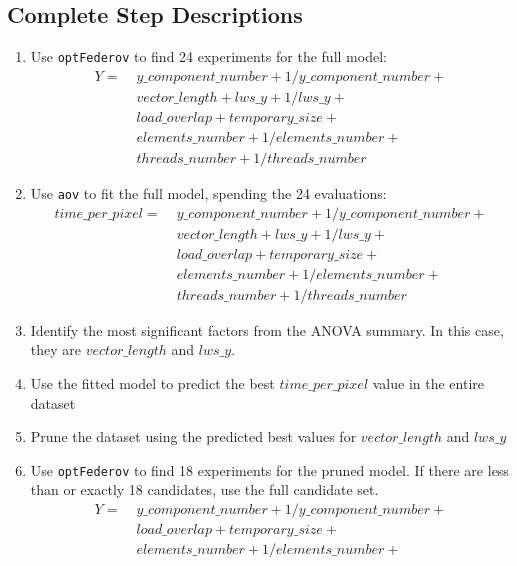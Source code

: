 \documentclass[final,12pt,a4paper]{article}
\begin{document}
\subsection{Complete Step Descriptions}
\label{sec:org521d9e7}
\begin{enumerate}
\item Use \texttt{optFederov} to find 24 experiments for the full model:
\begin{align*}
    Y = & \; y\_component\_number + 1 / y\_component\_number + \\
        & \; vector\_length + lws\_y + 1 / lws\_y + \\
        & \; load\_overlap + temporary\_size + \\
        & \; elements\_number + 1 / elements\_number + \\
        & \; threads\_number + 1 / threads\_number
\end{align*}
\item Use \texttt{aov} to fit the full model, spending the 24 evaluations:
\begin{align*}
      time\_per\_pixel = & \; y\_component\_number + 1 / y\_component\_number + \\
                        & \; vector\_length + lws\_y + 1 / lws\_y + \\
                        & \; load\_overlap + temporary\_size + \\
                        & \; elements\_number + 1 / elements\_number + \\
                        & \; threads\_number + 1 / threads\_number
\end{align*}
\item Identify the most significant factors from the ANOVA summary. In this
case, they are \(vector\_length\) and \(lws\_y\).
\item Use the fitted model to predict the best \(time\_per\_pixel\) value in the
entire dataset
\item Prune the dataset using the predicted best values for \(vector\_length\) and \(lws\_y\)
\item Use \texttt{optFederov} to find 18 experiments for the pruned model. If there are less
than or exactly 18 candidates, use the full candidate set.
\begin{align*}
    Y = & \; y\_component\_number + 1 / y\_component\_number + \\
        & \; load\_overlap + temporary\_size + \\
        & \; elements\_number + 1 / elements\_number + \\

\end{align*}
\end{enumerate}
\end{document}
